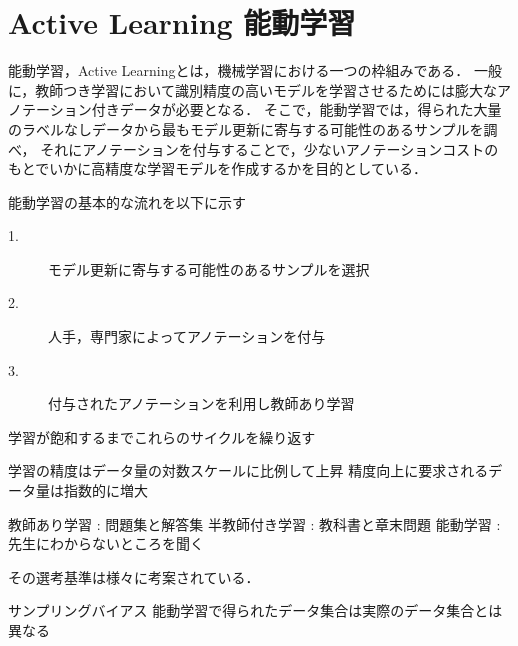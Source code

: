 \chapter{Active Learning 能動学習}
能動学習，Active Learning\cite{settles2010active}とは，機械学習における一つの枠組みである．
一般に，教師つき学習において識別精度の高いモデルを学習させるためには膨大なアノテーション付きデータが必要となる．
そこで，能動学習では，得られた大量のラベルなしデータから最もモデル更新に寄与する可能性のあるサンプルを調べ，
それにアノテーションを付与することで，少ないアノテーションコストのもとでいかに高精度な学習モデルを作成するかを目的としている．

能動学習の基本的な流れを以下に示す
\begin{description}
    \item[1.] モデル更新に寄与する可能性のあるサンプルを選択
    \item[2.] 人手，専門家によってアノテーションを付与
    \item[3.] 付与されたアノテーションを利用し教師あり学習
\end{description}

学習が飽和するまでこれらのサイクルを繰り返す

学習の精度はデータ量の対数スケールに比例して上昇
精度向上に要求されるデータ量は指数的に増大

教師あり学習 : 問題集と解答集
半教師付き学習 : 教科書と章末問題
能動学習 : 先生にわからないところを聞く


その選考基準は様々に考案されている．

サンプリングバイアス
    能動学習で得られたデータ集合は実際のデータ集合とは異なる


